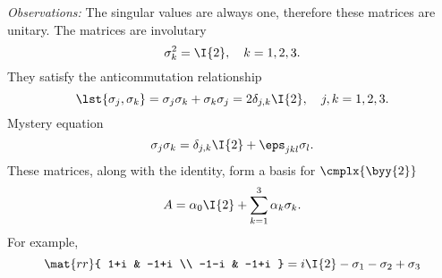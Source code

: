 {\it{Observations:}} The singular values are always one, therefore these matrices are unitary.
The matrices are involutary
\begin{equation}
  \sigma_{k}^{2} = \I{2}, \quad k = 1,2,3.
\end{equation}
They satisfy the anticommutation relationship
\begin{equation}
  \lst{\sigma_{j}, \sigma_{k}} = \sigma_{j} \sigma_{k} + \sigma_{k} \sigma_{j} = 2 \delta_{j,k} \I{2}, \quad j,k = 1,2,3.
\end{equation}
Mystery equation
\begin{equation}
   \sigma_{j} \sigma_{k} = \delta_{j,k} \I{2} + \eps_{jkl} \sigma_{l} .
\end{equation}
These matrices, along with the identity, form a basis for $\cmplx{\byy{2}}$
\begin{equation}
  A = \alpha_{0} \I{2} + \sum_{k=1}^{3} \alpha_{k} \sigma_{k}.
\end{equation}
For example,
\begin{equation}
  \mat{rr}{ 1+i & -1+i \\ -1-i & -1+i } = i \I{2} - \sigma_{1} - \sigma_{2} + \sigma_{3}
\end{equation}

\endinput